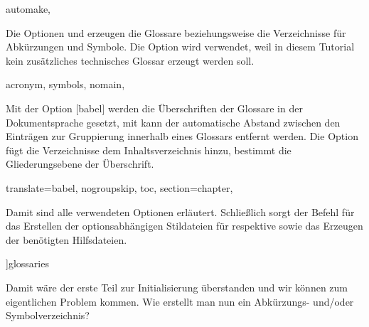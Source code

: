 \documentclass[%
  english,ngerman,%
  geometry=no,DIV=12,automark,%
]{tudscrartcl}
\begin{document}
%
\begin{Preamble}
  automake,%
\end{Preamble}
%
Die Optionen  und  erzeugen die Glossare 
beziehungsweise die Verzeichnisse für Abkürzungen und Symbole. Die Option  
 wird verwendet, weil in diesem Tutorial kein zusätzliches 
technisches Glossar erzeugt werden soll.
%
\begin{Preamble}
    acronym,%
    symbols,%
    nomain,%
\end{Preamble}
%
Mit der Option [babel] werden die Überschriften der Glossare 
in der Dokumentsprache gesetzt, mit  kann der automatische 
Abstand zwischen den Einträgen zur Gruppierung innerhalb eines Glossars 
entfernt werden. Die Option  fügt die Verzeichnisse dem 
Inhaltsverzeichnis hinzu,  bestimmt die Gliederungsebene der 
Überschrift.
%
\begin{Preamble}
  translate=babel,%
  nogroupskip,%
  toc,%
  section=chapter,%
\end{Preamble}
%
Damit sind alle verwendeten Optionen erläutert. Schließlich sorgt der Befehl 
 für das Erstellen der optionsabhängigen Stildateien für 
 respektive  sowie das Erzeugen der 
benötigten Hilfsdateien.
%
\begin{Preamble}
]{glossaries}
\makeglossaries

\end{Preamble}
%
Damit wäre der erste Teil zur Initialisierung überstanden und wir können zum 
eigentlichen Problem kommen. Wie erstellt man nun ein Abkürzungs- und/oder 
Symbolverzeichnis?
\end{document}
